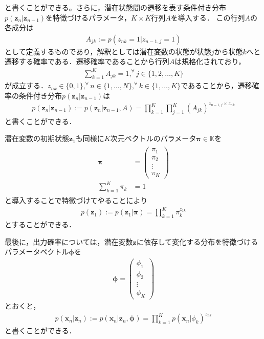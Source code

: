 \documentclass[dvipdfmx,autodetect-engine]{jsreport}
\begin{document}
と書くことができる。さらに，潜在状態間の遷移を表す条件付き分布$p(\bm{z}_n|\bm{z}_{n-1})$を特徴づけるパラメータ，$K \times K$行列$A$を導入する．
この行列$A$の各成分は
\begin{align}
    A_{jk} := p(z_{nk}=1|z_{n-1,j}=1)
	\label{}
\end{align}
として定義するものであり，解釈としては潜在変数の状態が状態$j$から状態$k$へと遷移する確率である．遷移確率であることから行列$A$は規格化されており，
\begin{align}
	\sum_{k=1}^{K} A_{jk} = 1 , ^\forall j \in \{1,2,\dots,K \}
	\label{}
\end{align}
が成立する．$z_{nk} \in \{0,1\} ,^\forall n \in \{1,\dots,N\},^\forall k \in \{1,\dots,K\}$であることから，遷移確率の条件付き分布$p(\bm{z}_n|\bm{z}_{n-1})$は
\begin{align}
    p(\bm{z}_n|\bm{z}_{n-1}) := p(\bm{z}_n|\bm{z}_{n-1},A) = \prod_{k=1}^K \prod_{j=1}^K (A_{jk})^{z_{n-1,j} \times z_{nk}}
    \label{ref:def_A}
\end{align}
と書くことができる．

潜在変数の初期状態$\bm{z}_1$も同様に$K$次元ベクトルのパラメータ$\bm{\pi}\in \mathbb{K}$を
\begin{align}
    \begin{aligned}
        \bm{\pi} &=
        \begin{pmatrix}
            \pi_1 \\
            \pi_2 \\
            \vdots \\
            \pi_{K}
        \end{pmatrix} \\
        \sum_{k=1}^K \pi_k &= 1
    \end{aligned}
    \label{}
\end{align}
と導入することで特徴づけてやることにより
\begin{align}
    p(\bm{z}_1) := p(\bm{z}_1|\bm{\pi}) = \prod_{k=1}^K \pi_k^{z_{1k}}
    \label{}
\end{align}
とすることができる．

最後に，出力確率については，潜在変数$\bm{z}$に依存して変化する分布を特徴づけるパラメータベクトル$\bm{\phi}$を
\begin{align}
    \bm{\phi}= 
    \begin{pmatrix}
        \phi_1 \\
        \phi_2 \\
        \vdots \\
        \phi_K
    \end{pmatrix}
    \label{}
\end{align}
とおくと，
\begin{align}
    p(\bm{x}_n|\bm{z}_n) := p(\bm{x}_n|\bm{z}_n,\bm{\phi}) = \prod_{k=1}^{K} p(\bm{x}_n|\phi_k)^{z_{nk}}
\end{align}
と書くことができる．
\end{document}
